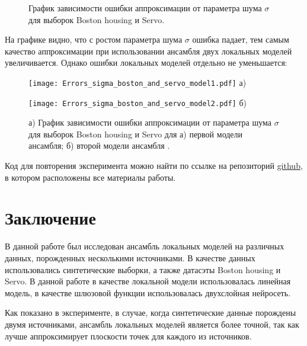 \documentclass[12pt, twoside]{article}
\begin{document}
\begin{figure}[H]
\caption{График зависимости ошибки аппроксимации от параметра шума $\sigma$ для выборок Boston housing и Servo.}
\label{ris:image}
\end{figure}

На графике видно, что с ростом параметра шума $\sigma$ ошибка падает, тем самым качество аппроксимации при использовании ансамбля двух локальных моделей увеличивается. Однако ошибки локальных моделей отдельно не уменьшается:


\begin{figure}[h]
\begin{center}
\begin{minipage}[h]{0.49\linewidth}
\begin{center}\texttt{[image: Errors\_sigma\_boston\_and\_servo\_model1.pdf]}  а) \end{center}
\end{minipage}
\hfill
\begin{minipage}[h]{0.49\linewidth}
\begin{center}\texttt{[image: Errors\_sigma\_boston\_and\_servo\_model2.pdf]}  б) \end{center}
\end{minipage}
\caption{а) График зависимости ошибки аппроксимации от параметра шума $\sigma$ для выборок Boston housing и Servo для а) первой модели ансамбля; б) второй модели ансамбля .}
\label{ris:image1}
\end{center}
\end{figure}

Код для повторения эксперимента можно найти по ссылке на репозиторий \href{https://github.com/Intelligent-Systems-Phystech/2020_Project-51}{github}, в котором расположены все материалы работы.
\section{Заключение}

В данной работе был исследован ансамбль локальных моделей на различных данных, порожденных несколькими источниками. В качестве данных использовались синтетические выборки, а также датасэты Boston housing и Servo. В данной работе в качестве локальной модели использовалась линейная модель, в качестве шлюзовой функции использовалась двухслойная нейросеть. 

Как показано в эксперименте, в случае, когда синтетические данные порождены двумя источниками, ансамбль локальных моделей является более точной, так как лучше аппроксимирует плоскости точек для каждого из источников. 
\end{document}

